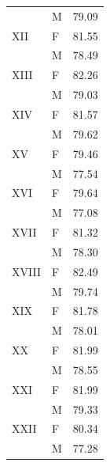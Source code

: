 \begin{tabular}{llc}
                   & M             & 79.09                               \\
XII                & F             & 81.55                               \\
                   & M             & 78.49                               \\
XIII               & F             & 82.26                               \\
                   & M             & 79.03                               \\
XIV                & F             & 81.57                               \\
                   & M             & 79.62                               \\
XV                 & F             & 79.46                               \\
                   & M             & 77.54                               \\
XVI                & F             & 79.64                               \\
                   & M             & 77.08                               \\
XVII               & F             & 81.32                               \\
                   & M             & 78.30                               \\
XVIII              & F             & 82.49                               \\
                   & M             & 79.74                               \\
XIX                & F             & 81.78                               \\
                   & M             & 78.01                               \\
XX                 & F             & 81.99                               \\
                   & M             & 78.55                               \\
XXI                & F             & 81.99                               \\
                   & M             & 79.33                               \\
XXII               & F             & 80.34                               \\
                   & M             & 77.28 \\
\bottomrule                   
\end{tabular}